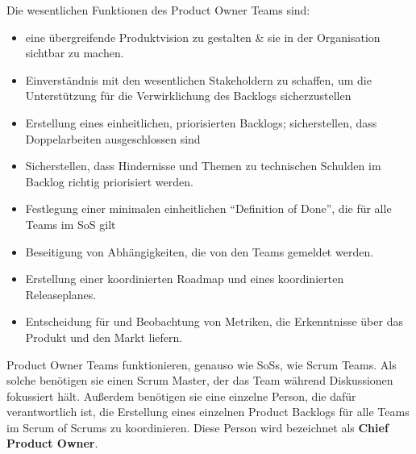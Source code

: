 \documentclass[12pt,a4paper,parskip=full]{scrartcl}
\begin{document}
Die wesentlichen Funktionen des Product Owner Teams sind:
\begin{itemize}
\item eine übergreifende Produktvision zu gestalten \& sie in der Organisation sichtbar zu machen.
\item Einverständnis mit den wesentlichen Stakeholdern zu schaffen, um die
Unterstützung für die Verwirklichung des Backlogs sicherzustellen
\item Erstellung eines einheitlichen, priorisierten Backlogs; sicherstellen, dass
Doppelarbeiten ausgeschlossen sind
\item Sicherstellen, dass Hindernisse und Themen zu technischen Schulden im Backlog richtig priorisiert werden.
\item Festlegung einer minimalen einheitlichen ``Definition of Done'', die für alle Teams im SoS gilt
\item Beseitigung von Abhängigkeiten, die von den Teams gemeldet werden.
\item Erstellung einer koordinierten Roadmap und eines koordinierten Releaseplanes.
\item Entscheidung für und Beobachtung von Metriken, die Erkenntnisse über das Produkt und den Markt liefern.
\end{itemize}
Product Owner Teams funktionieren, genauso wie SoSs, wie Scrum Teams. Als solche
benötigen sie einen Scrum Master, der das Team während Diskussionen fokussiert
hält. Außerdem benötigen sie eine einzelne Person, die dafür verantwortlich ist,
die Erstellung eines einzelnen Product Backlogs für alle Teams im Scrum of Scrums
zu koordinieren. Diese Person wird bezeichnet als \textbf{Chief Product Owner}.
\end{document}

